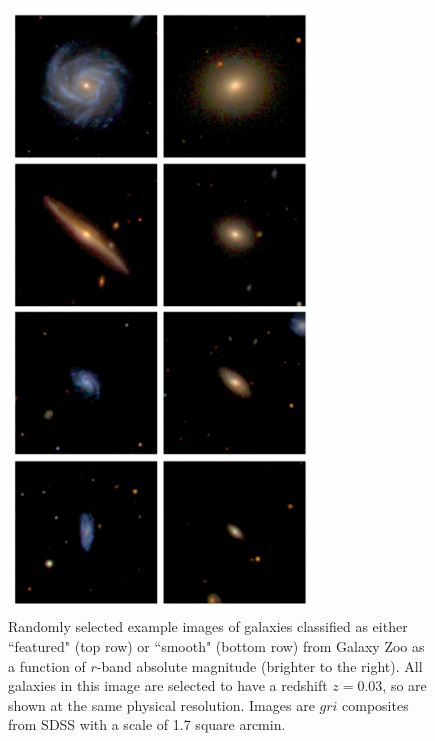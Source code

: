 \documentclass[usenatbib]{mn2e}
\begin{document}
\begin{figure}
\includegraphics[height=160mm,angle=-90]{Figure3.ps}
\caption{Randomly selected example images of galaxies classified as either ``featured" (top row) or ``smooth" (bottom row) from Galaxy Zoo as a function of $r$-band absolute magnitude (brighter to the right).  All galaxies in this image are selected to have a redshift $z=0.03$, so are shown at the same physical resolution. Images are $gri$ composites from SDSS with a scale of 1.7 square arcmin.  \label{examples}}
\end{figure}
\end{document}
